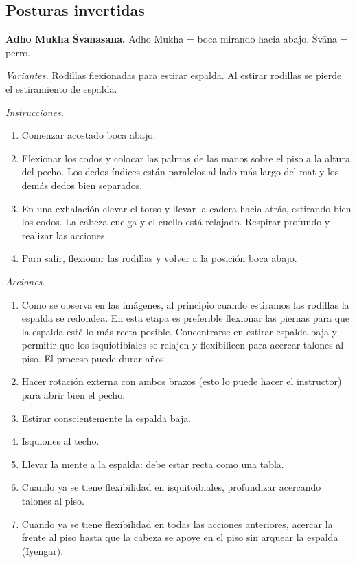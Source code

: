 \subsection{Posturas invertidas}
\label{section-posturas-invertidas}

\medskip\noindent\textbf{Adho Mukha
Śvānāsana.}
Adho Mukha = boca mirando hacia abajo. Śvāna
= perro.

\emph{Variantes.} Rodillas flexionadas para
estirar espalda. Al estirar rodillas se
pierde el estiramiento de espalda.

\emph{Instrucciones.}
\begin{enumerate}
\item Comenzar acostado boca abajo.
\item Flexionar los codos y colocar las
palmas de las manos sobre el piso a la altura
del pecho. Los dedos índices están paralelos
al lado más largo del mat y los demás dedos
bien separados.
\item En una exhalación elevar el torso y
llevar la cadera hacia atrás, estirando bien
los codos. La cabeza cuelga y el cuello está
relajado. Respirar profundo y realizar las
acciones.
\item Para salir, flexionar las rodillas y
volver a la posición boca abajo.
\end{enumerate}

\emph{Acciones.}
\begin{enumerate}
\item Como se observa en las imágenes, al
principio cuando estiramos las rodillas la
espalda se redondea. En esta etapa es
preferible flexionar las piernas para que la
espalda esté lo más recta posible.
Concentrarse en estirar espalda baja y
permitir que los isquiotibiales se relajen y
flexibilicen para acercar talones al piso. El
proceso puede durar años.
\item Hacer rotación externa con ambos brazos
(esto lo puede hacer el instructor) para
abrir bien el pecho.
\item Estirar conscientemente la espalda
baja.
\item Isquiones al techo.
\item Llevar la mente a la espalda: debe
estar recta como una tabla.
\item Cuando ya se tiene flexibilidad en
isquitoibiales, profundizar acercando talones
al piso.
\item Cuando ya se tiene flexibilidad en
todas las acciones anteriores, acercar la
frente al piso hasta que la cabeza se apoye
en el piso sin arquear la espalda (Iyengar).
\end{enumerate}


